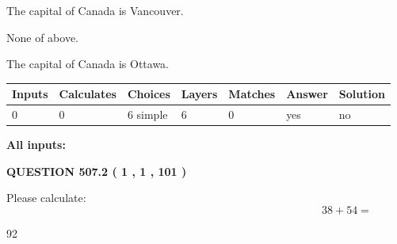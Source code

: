 \documentclass[12pt]{article}
\begin{document}
 
The capital of Canada is Vancouver.
 
 
 None of above.
 
 
\noindent{}
 
 
The capital of Canada is Ottawa.
 
 
\noindent{}
 
 
   
   
   
   
\noindent\begin{tabular}{|l|l|l|l|l|l|l|}
 \hline
Inputs & Calculates & Choices & Layers & Matches & Answer & Solution \\ \hline
 0  & 
 0  & 
 6
  simple  
  & 
 6  & 
 0  & 
  yes & 
  no 
  \\ \hline
 \end{tabular}
   
   
   
   
\noindent{}
   
   
   
   
\noindent\vspace{0.1in}\hspace{-0.08in} {\textbf{\Large{All inputs: }}}
   
   
  
\vspace{0.2in}
  
{\textbf{\Large{QUESTION
507.2 
 ( 1 , 1 , 101 )
}}}
  
  
 
Please calculate:
\begin{equation}
38 +  %
54 = \nonumber
\end{equation}
 
 
 
\noindent{}
 
 

92
 
 
\noindent{}
 
 

 
 
 
\noindent{}
 
\end{document}
